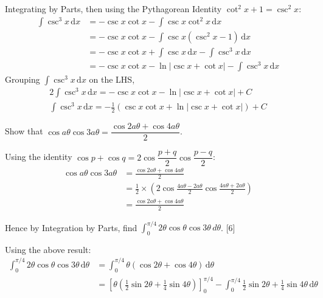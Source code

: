 \documentclass[12pt, a4 paper]{article}
\begin{document}
\begin{outline}[enumerate]
	\begin{answer}
		Integrating by Parts, then using the Pythagorean Identity $\cot^2 x+1=\csc^2 x$:
		\begin{align*}
			\int \csc^3x\,\mathrm{d}x & = -\csc x \cot x - \int \csc x \cot^2 x \,\mathrm{d}x                   \\
			                          & = -\csc x \cot x - \int \csc x (\csc^2 x -1) \,\mathrm{d}x              \\
			                          & = -\csc x \cot x + \int \csc x\,\mathrm{d}x - \int \csc^3x\,\mathrm{d}x \\
			                          & = -\csc x \cot x - \ln{|\csc x + \cot x|} - \int \csc^3x\,\mathrm{d}x
		\end{align*}
		Grouping $\int \csc^3x\,\mathrm{d}x$ on the LHS,
		\begin{align*}
			2\int \csc^3x\,\mathrm{d}x = -\csc x \cot x - \ln{|\csc x + \cot x|} + C             \\
			\int \csc^3x\,\mathrm{d}x = -\frac{1}{2}(\csc x \cot x + \ln{|\csc x + \cot x|}) + C
		\end{align*}
	\end{answer}
	\1 Show that $\cos{a\theta} \cos{3a\theta} = \dfrac{\cos{2a\theta} + \cos{4a\theta}}{2}$.\\
	\begin{answer}
		Using the identity $\cos p+\cos q=2\cos {\dfrac {p+q}{2}}\cos {\dfrac {p-q}{2}}$:
		\begin{align*}
			\cos{a\theta} \cos{3a\theta} & = \frac{\cos{2a\theta} + \cos{4a\theta}}{2}                                                  \\
			                             & = \frac{1}{2} \times (2 \cos{\frac{4a\theta-2a\theta}{2}} \cos{\frac{4a\theta+2a\theta}{2}}) \\
			                             & = \frac{\cos{2a\theta} + \cos{4a\theta}}{2}
		\end{align*}
	\end{answer}
	Hence by Integration by Parts, find $\int_0^{\pi/4} 2\theta\cos\theta\cos{3\theta}\,d\theta$. \hfill[6]
	\begin{answer}
		Using the above result:
		\begin{align*}
			\int_0^{\pi/4} 2\theta\cos\theta\cos{3\theta}\,\mathrm{d}\theta & = \int_0^{\pi/4} \theta(\cos{2\theta} + \cos{4\theta})\,\mathrm{d}\theta                                                                                       \\
			                                                                & = [\theta(\frac{1}{2}\sin{2\theta} + \frac{1}{4}\sin{4\theta})]_0^{\pi/4}-\int_0^{\pi/4} \frac{1}{2}\sin{2\theta} + \frac{1}{4}\sin{4\theta}\,\mathrm{d}\theta \\

\end{align*}
\end{answer}
\end{outline}
\end{document}
